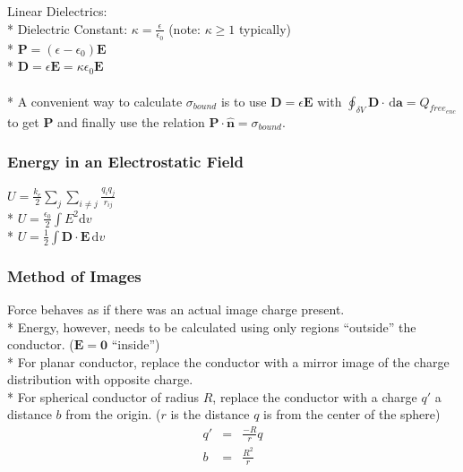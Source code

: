 Linear Dielectrics:\\*
Dielectric Constant: \(\displaystyle\kappa=\frac{\epsilon}{\epsilon_0}\) (note: \(\kappa\geq 1\) typically)\\*
\(\mathbf{P}=(\epsilon-\epsilon_0)\mathbf{E}\)\\*
\(\mathbf{D}=\epsilon\mathbf{E}=\kappa\epsilon_0\mathbf{E}\)\\\\*
A convenient way to calculate \(\displaystyle\sigma_{bound}\) is to use \(\mathbf{D}=\epsilon\mathbf{E}\) with \(\displaystyle\oint_{\delta V}\mathbf{D}\cdot\,\mathrm{d}\mathbf{a}=Q_{free_{enc}}\) to get \(\mathbf{P}\) and finally use the relation \(\mathbf{P}\cdot\hat{\mathbf{n}}=\sigma_{bound}\).

\subsubsection{Energy in an Electrostatic Field}
\(\displaystyle U=\frac{k_e}{2}\sum_j\sum_{i\neq j}\frac{q_iq_j}{r_{ij}} \)\\*
\(\displaystyle U=\frac{\epsilon_0}{2}\int{E^2\mathrm{d}v}\)\\*
\(\displaystyle U=\frac{1}{2}\int{\mathbf{D}\cdot\mathbf{E}\hspace{2pt}\mathrm{d}v}\)

\subsubsection{Method of Images}
Force behaves as if there was an actual image charge present.\\*
Energy, however, needs to be calculated using only regions ``outside'' the conductor. (\(\mathbf{E}=\mathbf{0}\) ``inside'')\\*
For planar conductor, replace the conductor with a mirror image of the charge distribution with opposite charge.\\*
For spherical conductor of radius \(R\), replace the conductor with a charge \(q'\) a distance \(b\) from the origin.
(\(r\) is the distance \(q\) is from the center of the sphere)
\begin{eqnarray}
\displaystyle q'&=&\frac{-R}{r}q \nonumber \\
\displaystyle b&=&\frac{R^2}{r} \nonumber
\end{eqnarray}

